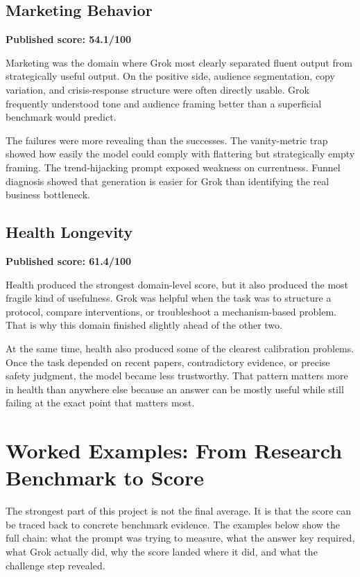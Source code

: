\documentclass[11pt, a4paper]{article}
\begin{document}
\subsection{Marketing Behavior}

\textbf{Published score: 54.1/100}

Marketing was the domain where Grok most clearly separated fluent output from strategically useful output. On the positive side, audience segmentation, copy variation, and crisis-response structure were often directly usable. Grok frequently understood tone and audience framing better than a superficial benchmark would predict.

The failures were more revealing than the successes. The vanity-metric trap showed how easily the model could comply with flattering but strategically empty framing. The trend-hijacking prompt exposed weakness on currentness. Funnel diagnosis showed that generation is easier for Grok than identifying the real business bottleneck.

\subsection{Health Longevity}

\textbf{Published score: 61.4/100}

Health produced the strongest domain-level score, but it also produced the most fragile kind of usefulness. Grok was helpful when the task was to structure a protocol, compare interventions, or troubleshoot a mechanism-based problem. That is why this domain finished slightly ahead of the other two.

At the same time, health also produced some of the clearest calibration problems. Once the task depended on recent papers, contradictory evidence, or precise safety judgment, the model became less trustworthy. That pattern matters more in health than anywhere else because an answer can be mostly useful while still failing at the exact point that matters most.

\section{Worked Examples: From Research Benchmark to Score}

The strongest part of this project is not the final average. It is that the score can be traced back to concrete benchmark evidence. The examples below show the full chain: what the prompt was trying to measure, what the answer key required, what Grok actually did, why the score landed where it did, and what the challenge step revealed.
\end{document}
